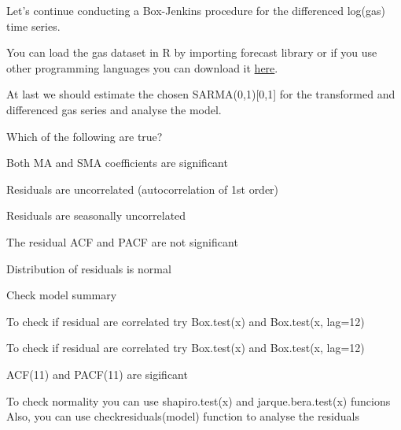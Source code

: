 
\begin{question}
Let's continue conducting a Box-Jenkins procedure for the differenced log(gas) time series.

You can load the gas dataset in R by importing forecast library or if you use other programming languages you can download it \href{https://github.com/vincentarelbundock/Rdatasets/blob/master/csv/forecast/gas.csv}{here}.

At last we should estimate the chosen SARMA(0,1){[}0,1{]} for the transformed and differenced gas series and analyse the model.

Which of the following are true?
\begin{answerlist}
  \item Both MA and SMA coefficients are significant
  \item Residuals are uncorrelated (autocorrelation of 1st order)
  \item Residuals are seasonally uncorrelated
  \item The residual ACF and PACF are not significant
  \item Distribution of residuals is normal
\end{answerlist}
\end{question}

\begin{solution}
\begin{answerlist}
  \item Check model summary
  \item To check if residual are correlated try Box.test(x) and Box.test(x, lag=12)
  \item To check if residual are correlated try Box.test(x) and Box.test(x, lag=12)
  \item ACF(11) and PACF(11) are sigificant
  \item To check normality you can use shapiro.test(x) and jarque.bera.test(x) funcions Also, you can use checkresiduals(model) function to analyse the residuals
\end{answerlist}
\end{solution}

